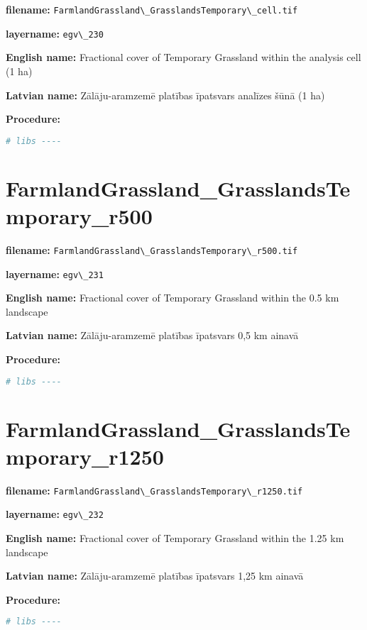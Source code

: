 \documentclass[
]{book}
\newcommand{\passthrough}[1]{#1}
\begin{document}
\textbf{filename:} \passthrough{\lstinline!FarmlandGrassland\_GrasslandsTemporary\_cell.tif!}

\textbf{layername:} \passthrough{\lstinline!egv\_230!}

\textbf{English name:} Fractional cover of Temporary Grassland within the analysis cell (1 ha)

\textbf{Latvian name:} Zālāju-aramzemē platības īpatsvars analīzes šūnā (1 ha)

\textbf{Procedure:}

\begin{lstlisting}[language=R]
# libs ----
\end{lstlisting}

\section{FarmlandGrassland\_GrasslandsTemporary\_r500}\label{ch06.231}

\textbf{filename:} \passthrough{\lstinline!FarmlandGrassland\_GrasslandsTemporary\_r500.tif!}

\textbf{layername:} \passthrough{\lstinline!egv\_231!}

\textbf{English name:} Fractional cover of Temporary Grassland within the 0.5 km landscape

\textbf{Latvian name:} Zālāju-aramzemē platības īpatsvars 0,5 km ainavā

\textbf{Procedure:}

\begin{lstlisting}[language=R]
# libs ----
\end{lstlisting}

\section{FarmlandGrassland\_GrasslandsTemporary\_r1250}\label{ch06.232}

\textbf{filename:} \passthrough{\lstinline!FarmlandGrassland\_GrasslandsTemporary\_r1250.tif!}

\textbf{layername:} \passthrough{\lstinline!egv\_232!}

\textbf{English name:} Fractional cover of Temporary Grassland within the 1.25 km landscape

\textbf{Latvian name:} Zālāju-aramzemē platības īpatsvars 1,25 km ainavā

\textbf{Procedure:}

\begin{lstlisting}[language=R]
# libs ----
\end{lstlisting}
\end{document}

